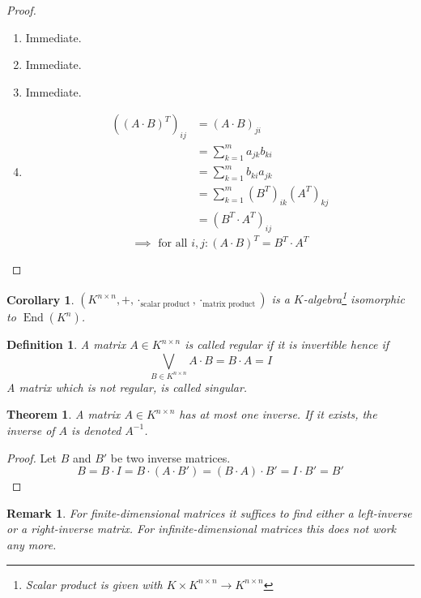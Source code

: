 \documentclass[a4paper,landscape,twocolumn]{article}
\newtheorem{theorem}{Theorem}[section]
\newtheorem{defi}{Definition}[section]
\newtheorem{rem}{Remark}[section]
\newtheorem{cor}{Corollary}[section]
\DeclareMathOperator\End{End} %
\begin{document}
\begin{proof}
  \begin{enumerate}
    \item Immediate.
    \item Immediate.
    \item Immediate.
    \item
      \begin{align*}
        \left((A \cdot B)^T\right)_{ij}
          &= (A \cdot B)_{ji} \\
          &= \sum_{k=1}^m a_{jk} b_{ki} \\
          &= \sum_{k=1}^m b_{ki} a_{jk} \\
          &= \sum_{k=1}^m (B^T)_{ik} (A^T)_{kj} \\
          &= \left(B^T \cdot A^T\right)_{ij}
      \end{align*}
      \[ \implies \text{ for all } i,j: (A\cdot B)^T = B^T \cdot A^T \]
  \end{enumerate}
\end{proof}
\begin{cor}
  \label{korollar-6.11}
  $(K^{n\times n}, +, \cdot_{\text{scalar product}}, \cdot_{\text{matrix product}})$
  is a $K$-algebra\footnote{Scalar product is given with $K \times K^{n\times n} \to K^{n \times n}$}
  isomorphic to $\End(K^n)$.
\end{cor}
\begin{defi}
  A matrix $A \in K^{n\times n}$ is called \emph{regular} if it is invertible
  hence if
  \[ \bigvee_{B\in K^{n\times n}} A \cdot B = B \cdot A = I \]
  A matrix which is not regular, is called \emph{singular}.
\end{defi}

\begin{theorem}
  \label{satz-6.13}
  A matrix $A \in K^{n\times n}$ has at most one inverse.
  If it exists, the inverse of $A$ is denoted $A^{-1}$.
\end{theorem}
\begin{proof}
  Let $B$ and $B'$ be two inverse matrices.
  \[ B = B \cdot I = B \cdot (A \cdot B') = (B \cdot A) \cdot B' = I \cdot B' = B' \]
\end{proof}
\begin{rem}
  For finite-dimensional matrices it suffices to find either a left-inverse or a right-inverse matrix.
  For infinite-dimensional matrices this does not work any more.
\end{rem}
\end{document}
